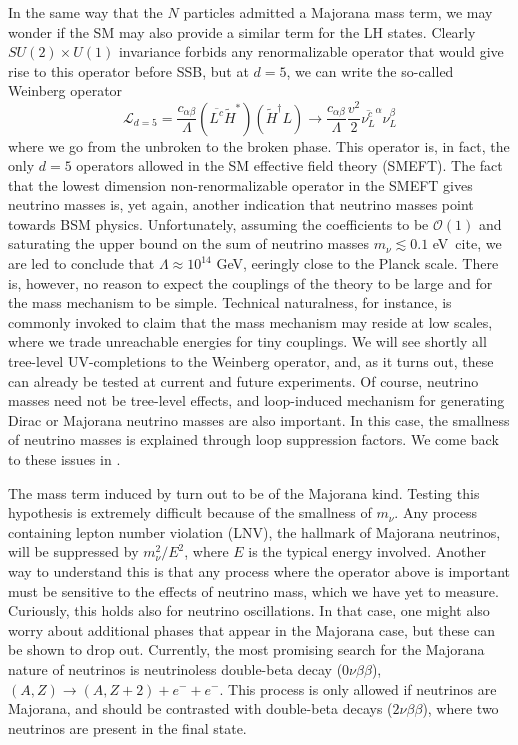 In the same way that the $N$ particles admitted a Majorana mass term, we may wonder if the SM may also provide a similar term for the LH states. Clearly $SU(2) \times U(1)$ invariance forbids any renormalizable operator that would give rise to this operator before SSB, but at $d=5$, we can write the so-called Weinberg operator
%
\begin{equation}\label{eq:weinberg}
 \mathscr{L}_{d=5} = \frac{c_{\alpha\beta}}{\Lambda} \left( \overline{L^c} \widetilde{H}^* \right) \left( \widetilde{H}^\dagger L  \right) \to  \frac{c_{\alpha\beta}}{\Lambda} \frac{v^2}{2} \overline{\nu_L^c}^\alpha \nu_L^\beta
\end{equation}
%
where we go from the unbroken to the broken phase. This operator is, in fact, the only $d=5$ operators allowed in the SM effective field theory (SMEFT). The fact that the lowest dimension non-renormalizable operator in the SMEFT gives neutrino masses is, yet again, another indication that neutrino masses point towards BSM physics. Unfortunately, assuming the coefficients to be $\mathcal{O}(1)$ and saturating the upper bound on the sum of neutrino masses $m_\nu \lesssim 0.1 $ eV~cite{}, we are led to conclude that $\Lambda \approx 10^{14}$ GeV, eeringly close to the Planck scale. There is, however, no reason to expect the couplings of the theory to be large and for the mass mechanism to be simple. Technical naturalness, for instance, is commonly invoked to claim that the mass mechanism may reside at low scales, where we trade unreachable energies for tiny couplings. We will see shortly all tree-level UV-completions to the Weinberg operator, and, as it turns out, these can already be tested at current and future experiments. Of course, neutrino masses need not be tree-level effects, and loop-induced mechanism for generating Dirac or Majorana neutrino masses are also important. In this case, the smallness of neutrino masses is explained through loop suppression factors. We come back to these issues in .


The mass term induced by  turn out to be of the Majorana kind. Testing this hypothesis is extremely difficult because of the smallness of $m_\nu$. Any process containing lepton number violation (LNV), the hallmark of Majorana neutrinos, will be suppressed by $m_\nu^2/E^2$, where $E$ is the typical energy involved. Another way to understand this is that any process where the operator above is important must be sensitive to the effects of neutrino mass, which we have yet to measure. Curiously, this holds also for neutrino oscillations. In that case, one might also worry about additional phases that appear in the Majorana case, but these can be shown to drop out. Currently, the most promising search for the Majorana nature of neutrinos is neutrinoless double-beta decay ($0\nu\beta\beta$), $(A,Z)\to(A,Z+2) + e^- + e^-$. This process is only allowed if neutrinos are Majorana, and should be contrasted with double-beta decays ($2\nu\beta\beta$), where two neutrinos are present in the final state.  




